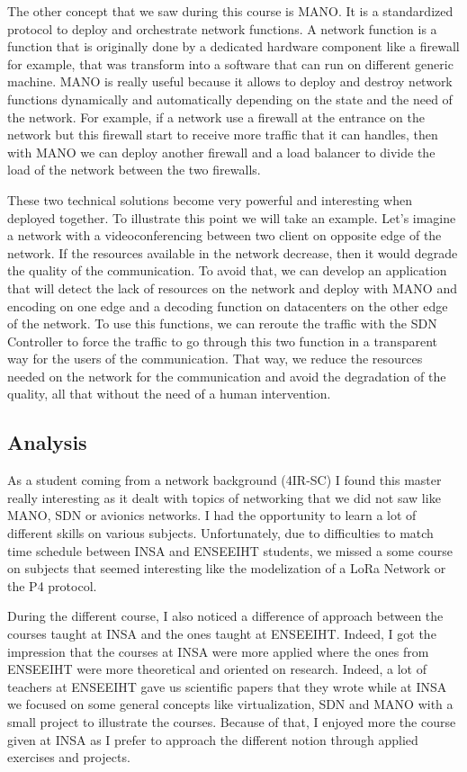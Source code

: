 The other concept that we saw during this course is MANO. It is a standardized protocol to deploy and orchestrate network functions. A network function is a function that is originally done by a dedicated hardware component like a firewall for example, that was transform into a software that can run on different generic machine. MANO is really useful because it allows to deploy and destroy network functions dynamically and automatically depending on the state and the need of the network. For example, if a network use a firewall at the entrance on the network but this firewall start to receive more traffic that it can handles, then with MANO we can deploy another firewall and a load balancer to divide the load of the network between the two firewalls.
\\\par

These two technical solutions become very powerful and interesting when deployed together. To illustrate this point we will take an example. Let's imagine a network with a videoconferencing between two client on opposite edge of the network. If the resources available in the network decrease, then it would degrade the quality of the communication. To avoid that, we can develop an application that will detect the lack of resources on the network and deploy with MANO and encoding on one edge and a decoding function on datacenters on the other edge of the network. To use this functions, we can reroute the traffic with the SDN Controller to force the traffic to go through this two function in a transparent way for the users of the communication. That way, we reduce the resources needed on the network for the communication and avoid the degradation of the quality, all that without the need of a human intervention.

\subsection{Analysis}

As a student coming from a network background (4IR-SC) I found this master really interesting as it dealt with topics of networking that we did not saw like MANO, SDN or avionics networks. I had the opportunity to learn a lot of different skills on various subjects. Unfortunately, due to difficulties to match time schedule between INSA and ENSEEIHT students, we missed a some course on subjects that seemed interesting like the modelization of a LoRa Network or the P4 protocol. 
\\\par
During the different course, I also noticed a difference of approach between the courses taught at INSA and the ones taught at ENSEEIHT. Indeed, I got the impression that the courses at INSA were more applied where the ones from ENSEEIHT were more theoretical and oriented on research. Indeed, a lot of teachers at ENSEEIHT gave us scientific papers that they wrote while at INSA we focused on some general concepts like virtualization, SDN and MANO with a small project to illustrate the courses. Because of that, I enjoyed more the course given at INSA as I prefer to approach the different notion through applied exercises and projects.
